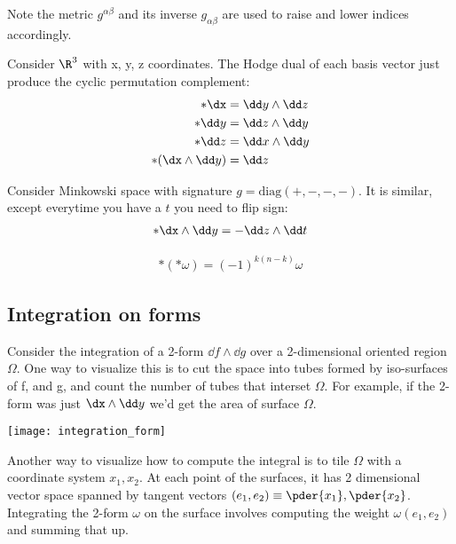 \documentclass[11pt]{scrartcl}
\begin{document}
Note the metric $g^{\alpha \beta}$ and its inverse $g_{\alpha \beta}$ are used to raise and lower indices accordingly.

\begin{example}
	Consider $\R^3$ with x, y, z coordinates.  The Hodge dual of each basis vector
	just produce the cyclic permutation complement:
	\begin{align}
		* \dx &= \dd y \wedge \dd z \\
		* \dd y &= \dd z \wedge \dd y \\
		* \dd z &= \dd x \wedge \dd y \\
		*(\dx \wedge \dd y) &= \dd z
	\end{align}
\end{example}

\begin{example}
	Consider Minkowski space with signature $g = \text{diag}(+, -, -, -)$.  It is similar, except everytime you have a $t$ you need to flip sign:
	\begin{align}
		* \dx \wedge \dd y = - \dd z \wedge \dd t
	\end{align} 
\end{example}

\begin{lemma}
	\begin{align}*(* \omega) = (-1)^{k(n-k)} \omega \end{align}
\end{lemma}



\subsection{Integration on forms}

Consider the integration of a 2-form $\dd f \wedge \dd g$ over a 2-dimensional oriented region $\Omega$.  One way to visualize this is to cut the space into tubes formed by iso-surfaces of f, and g, and count the number of tubes that interset $\Omega$.  For example, if the 2-form was just $\dx \wedge \dd y$ we'd get the area of surface $\Omega$.

\texttt{[image: integration\_form]}

Another way to visualize how to compute the integral is to tile $\Omega$ with a coordinate system $x_1, x_2$. At each point of the surfaces, it has 2 dimensional vector space spanned by tangent vectors $(e_1, e_2) \equiv \pder{x_1}, \pder{x_2}$.  Integrating the 2-form $\omega$ on the surface involves computing the weight $\omega (e_1, e_2)$ and summing that up.
\end{document}
